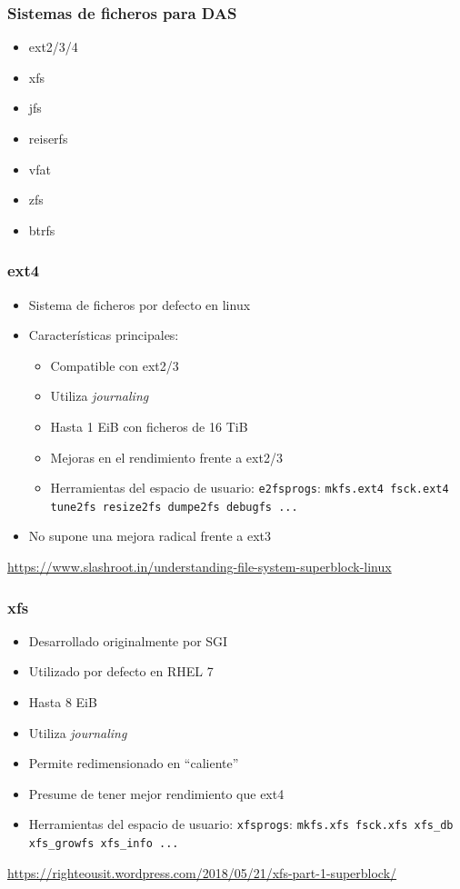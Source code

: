 \documentclass[aspectratio=169]{beamer}
\begin{document}
\begin{frame}
  \frametitle{Sistemas de ficheros para DAS}
  \begin{itemize}
  \item ext2/3/4
  \item xfs
  \item jfs
  \item reiserfs
  \item vfat
  \item zfs
  \item btrfs
  \end{itemize}
\end{frame}

\begin{frame}
  \frametitle{ext4}
  \begin{itemize}
  \item Sistema de ficheros por defecto en linux
  \item Características principales:
    \begin{itemize}
    \item Compatible con ext2/3
    \item Utiliza \textit{journaling}
    \item Hasta 1 EiB con ficheros de 16 TiB
    \item Mejoras en el rendimiento frente a ext2/3
    \item Herramientas del espacio de usuario: \texttt{e2fsprogs}:
      \texttt{mkfs.ext4 fsck.ext4 tune2fs resize2fs dumpe2fs debugfs ...}
    \end{itemize}
  \item No supone una mejora radical frente a ext3
  \end{itemize}
  \small{\url{https://www.slashroot.in/understanding-file-system-superblock-linux}}
\end{frame}

\begin{frame}
  \frametitle{xfs}
  \begin{itemize}
  \item Desarrollado originalmente por SGI
  \item Utilizado por defecto en RHEL 7
  \item Hasta 8 EiB
  \item Utiliza \textit{journaling}
  \item Permite redimensionado en ``caliente''
  \item Presume de tener mejor rendimiento que ext4
  \item Herramientas del espacio de usuario: \texttt{xfsprogs}:
     \texttt{mkfs.xfs fsck.xfs xfs\_db xfs\_growfs xfs\_info ...}
  \end{itemize}
  \small{\url{https://righteousit.wordpress.com/2018/05/21/xfs-part-1-superblock/}}
\end{frame}
\end{document}
